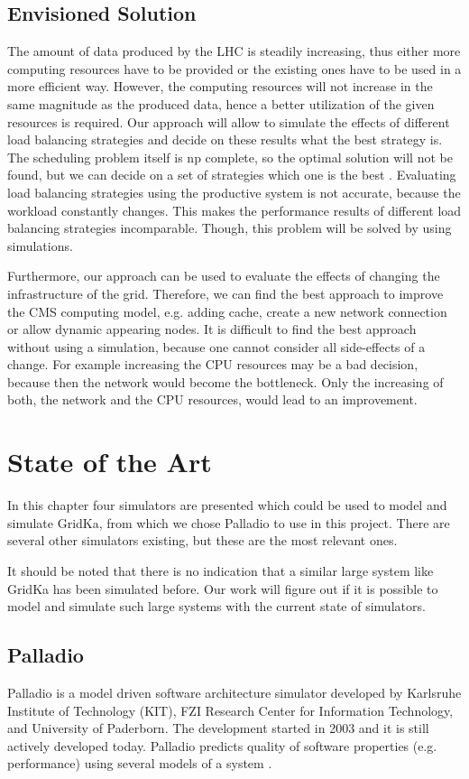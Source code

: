 \section{Envisioned Solution} 
The amount of data produced by the LHC is steadily increasing, thus either more computing resources have to be provided or the existing ones have to be used in a more efficient way.
However, the computing resources will not increase in the same magnitude as the produced data, hence a better utilization of the given resources is required. Our approach will allow to simulate the effects of different load balancing strategies and decide on these results what the best strategy is. The scheduling problem itself is np complete, so the optimal solution will not be found, but we can decide on a set of strategies which one is the best \cite{1698650}. Evaluating load balancing strategies using the productive system is not accurate, because the workload constantly changes. This makes the performance results of different load balancing strategies incomparable. Though, this problem will be solved by using simulations.

Furthermore, our approach can be used to evaluate the effects of changing the infrastructure of the grid. Therefore, we can find the best approach to improve the CMS computing model, e.g. adding cache, create a new network connection or allow dynamic appearing nodes.
It is difficult to find the best approach without using a simulation, because one cannot consider all side-effects of a change. For example increasing the CPU resources may be a bad decision, because then the network would become the bottleneck. Only the increasing of both, the network and the CPU resources, would lead to an improvement.


\chapter {State of the Art}
In this chapter four simulators are presented which could be used to model and simulate GridKa, from which we chose Palladio to use in this project. There are several other simulators existing, but these are the most relevant ones.

It should be noted that there is no indication that a similar large system like GridKa has been simulated before. Our work will figure out if it is possible to model and simulate such large systems with the current state of simulators.

\section{Palladio}
\label{palladio}
Palladio is a model driven software architecture simulator developed by Karlsruhe Institute of Technology (KIT), FZI Research Center for Information Technology, and University of Paderborn. The development started in 2003 and it is still actively developed today. Palladio predicts quality of software properties (e.g. performance) using several models of a system \cite{BECKER20093}.

